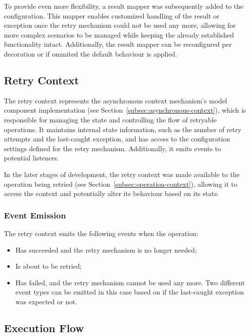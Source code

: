 To provide even more flexibility, a result mapper was subsequently added to the configuration.
This mapper enables customized handling of the result or exception once the retry mechanism could not be used any more,
allowing for more complex scenarios to be managed while keeping the already established functionality intact.
Additionally, the result mapper can be reconfigured per decoration or if ommited the default behaviour is applied.

\subsection{Retry Context}\label{subsec:retry-context}

The retry context represents the asynchronous context mechanism's model component implementation
(see Section~\ref{subsec:asynchronous-context}),
which is responsible for managing the state and controlling the flow of retryable operations.
It maintains internal state information, such as the number of retry attempts and the last-caught exception,
and has access to the configuration settings defined for the retry mechanism.
Additionally, it emits events to potential listeners.

In the later stages of development,
the retry context was made available to the operation being retried (see Section~\ref{subsec:operation-context}),
allowing it to access the context and potentially alter its behaviour based on its state.

\subsubsection{Event Emission}\label{subsubsec:retry-context-event-emission}

The retry context emits the following events when the operation:

\begin{itemize}
    \item Has succeeded and the retry mechanism is no longer needed;
    \item Is about to be retried;
    \item Has failed, and the retry mechanism cannot be used any more.
    Two different event types can be emitted in this case based on if the last-caught exception was expected or not.
\end{itemize}

\subsection{Execution Flow}\label{subsec:retry-execution-flow}

